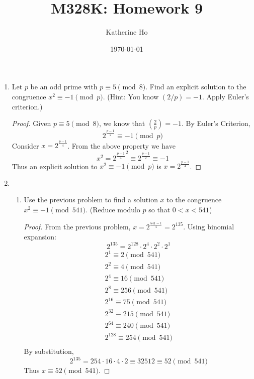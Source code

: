 \documentclass[11pt]{article}
\title{M328K: Homework 9}
\author{Katherine Ho}
\date\today
\theoremstyle{definition}
\newcommand{\legendre}[2]{\ensuremath{\left( \frac{#1}{#2} \right) }}
\begin{document}
\maketitle

\begin{enumerate}
    \item Let $p$ be an odd prime with $p\equiv 5\pmod{8}$. Find an explicit solution to the congruence $x^2 \equiv -1 \pmod p$. (Hint: You know $(2/p) = -1$. Apply Euler's criterion.)
    \begin{proof}
        Given $p\equiv 5\pmod{8}$, we know that $\legendre{2}{p} = -1$. By Euler's Criterion,
        \[
            2^{\frac{p-1}{2}} \equiv -1 \pmod{p}
        \]
        Consider $x = 2^{\frac{p-1}{4}}$. From the above property we have
        \[
            x^2 = {2^{\frac{p-1}{4}}}^2 \equiv 2^{\frac{p-1}{2}} \equiv -1
        \]
        Thus an explicit solution to $x^2\equiv -1\pmod{p}$ is $x = 2^{\frac{p-1}{4}}$.
    \end{proof}

    \item \begin{enumerate}
        \item Use the previous problem to find a solution $x$ to the congruence $x^2 \equiv -1 \pmod{541}$. (Reduce modulo $p$ so that $0<x<541$)
        \begin{proof}
            From the previous problem, $x = 2^{\frac{541-1}{4}} = 2^{135}$.
            Using binomial expansion:
            \[
                2^{135} = 2^{128}\cdot 2^4\cdot 2^2\cdot 2^1
            \]
            \begin{align*}
                2^1\equiv 2\pmod{541} \\
                2^2\equiv 4\pmod{541} \\
                2^4\equiv 16\pmod{541} \\
                2^8\equiv 256\pmod{541} \\
                2^{16}\equiv 75\pmod{541} \\
                2^{32}\equiv 215\pmod{541} \\
                2^{64}\equiv 240\pmod{541} \\
                2^{128}\equiv 254\pmod{541} \\
            \end{align*}
            By substitution,
            \[
                2^{135} = 254\cdot 16\cdot 4\cdot 2 \equiv 32512\equiv 52\pmod{541}
            \]
            Thus $x\equiv 52\pmod{541}$. 
        \end{proof}
    

\end{enumerate}
\end{enumerate}
\end{document}
